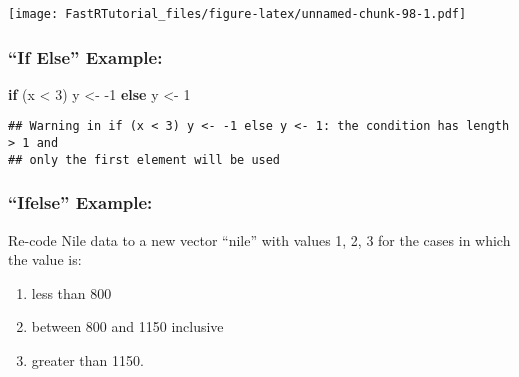 \documentclass[
]{article}
\newenvironment{Shaded}{\begin{snugshade}}{\end{snugshade}}
\newcommand{\AttributeTok}[1]{\textcolor[rgb]{0.77,0.63,0.00}{#1}}
\newcommand{\ControlFlowTok}[1]{\textcolor[rgb]{0.13,0.29,0.53}{\textbf{#1}}}
\newcommand{\DecValTok}[1]{\textcolor[rgb]{0.00,0.00,0.81}{#1}}
\newcommand{\FloatTok}[1]{\textcolor[rgb]{0.00,0.00,0.81}{#1}}
\newcommand{\FunctionTok}[1]{\textcolor[rgb]{0.00,0.00,0.00}{#1}}
\newcommand{\NormalTok}[1]{#1}
\newcommand{\OtherTok}[1]{\textcolor[rgb]{0.56,0.35,0.01}{#1}}
\newcommand{\SpecialCharTok}[1]{\textcolor[rgb]{0.00,0.00,0.00}{#1}}
\providecommand{\tightlist}{%
  \setlength{\itemsep}{0pt}\setlength{\parskip}{0pt}}
\begin{document}
\begin{Shaded}
\end{Shaded}

\texttt{[image: FastRTutorial\_files/figure-latex/unnamed-chunk-98-1.pdf]}

\hypertarget{if-else-example}{%
\subsubsection{``If Else'' Example:}\label{if-else-example}}

\begin{Shaded}
\begin{Highlighting}[]
\ControlFlowTok{if}\NormalTok{ (x }\SpecialCharTok{\textless{}} \DecValTok{3}\NormalTok{) y }\OtherTok{\textless{}{-}} \SpecialCharTok{{-}}\DecValTok{1} \ControlFlowTok{else}\NormalTok{ y }\OtherTok{\textless{}{-}} \DecValTok{1}
\end{Highlighting}
\end{Shaded}

\begin{verbatim}
## Warning in if (x < 3) y <- -1 else y <- 1: the condition has length > 1 and
## only the first element will be used
\end{verbatim}

\hypertarget{ifelse-example}{%
\subsubsection{``Ifelse'' Example:}\label{ifelse-example}}

\begin{Shaded}
\end{Shaded}

Re-code Nile data to a new vector ``nile'' with values 1, 2, 3 for the
cases in which the value is:

\begin{enumerate}
\def\labelenumi{\arabic{enumi}.}
\tightlist
\item
  less than 800
\item
  between 800 and 1150 inclusive
\item
  greater than 1150.
\end{enumerate}
\end{document}
